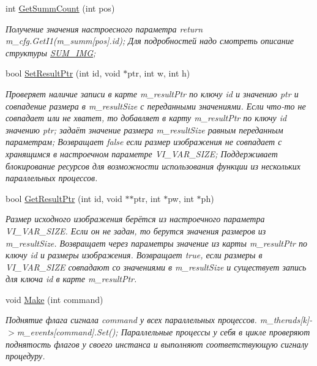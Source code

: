 \begin{DoxyCompactItemize}
int \hyperlink{class_c_v_i_engine_base_a354f23eda839e4aff3b578fc5ad50363}{Get\+Summ\+Count} (int pos)
\begin{DoxyCompactList}\small\item\em Получение значения настроесного параметра return m\+\_\+cfg.\+Get\+I1(m\+\_\+summ\mbox{[}pos\mbox{]}.id); Для подробностей надо смотреть описание структуры \hyperlink{class_s_u_m___i_m_g}{S\+U\+M\+\_\+\+I\+M\+G}; \end{DoxyCompactList}\item 
bool \hyperlink{class_c_v_i_engine_base_a38d38d266d48fad44435eec46a1086a6}{Set\+Result\+Ptr} (int id, void $\ast$ptr, int w, int h)
\begin{DoxyCompactList}\small\item\em Проверяет наличие записи в карте m\+\_\+result\+Ptr по ключу id и значению ptr и совпадение размера в m\+\_\+result\+Size с переданными значениями. Если что-\/то не совпадает или не хватет, то добавляет в карту m\+\_\+result\+Ptr по ключу id значению ptr; задаёт значение размера m\+\_\+result\+Size равным переданным параметрам; Возвращает false если размер изображения не совпадает с хранящимся в настроечном параметре V\+I\+\_\+\+V\+A\+R\+\_\+\+S\+I\+Z\+E; Поддерживает блокирование ресурсов для возможности использования функции из нескольких параллельных процессов. \end{DoxyCompactList}\item 
bool \hyperlink{class_c_v_i_engine_base_a99f7df701bfe9d53121e5cd00167e591}{Get\+Result\+Ptr} (int id, void $\ast$$\ast$ptr, int $\ast$pw, int $\ast$ph)
\begin{DoxyCompactList}\small\item\em Размер исходного изображения берётся из настроечного параметра V\+I\+\_\+\+V\+A\+R\+\_\+\+S\+I\+Z\+E. Если он не задан, то берутся значения размеров из m\+\_\+result\+Size. Возвращает через параметры значение из карты m\+\_\+result\+Ptr по ключу id и размеры изображения. Возвращает true, если размеры в V\+I\+\_\+\+V\+A\+R\+\_\+\+S\+I\+Z\+E совпадают со значениями в m\+\_\+result\+Size и существует запись для ключа id в карте m\+\_\+result\+Ptr. \end{DoxyCompactList}\item 
void \hyperlink{class_c_v_i_engine_base_aa59b55fc315394f4c19cb7d95c399913}{Make} (int command)
\begin{DoxyCompactList}\small\item\em Поднятие флага сигнала command у всех параллельных процессов. m\+\_\+therads\mbox{[}k\mbox{]}-\/$>$m\+\_\+events\mbox{[}command\mbox{]}.Set(); Параллельные процессы у себя в цикле проверяют поднятость флагов у своего инстанса и выполняют соответствующую сигналу процедуру. \end{DoxyCompactList}\item 
$$
\end{DoxyCompactItemize}
